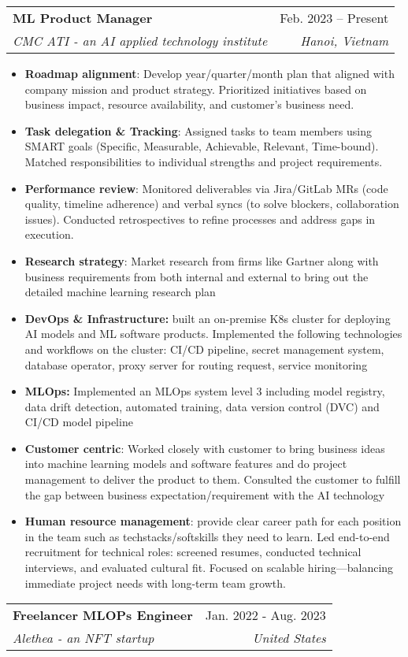 \documentclass[letterpaper,11pt]{article}
\makeatletter
\newcommand{\resumeItem}[1]{
  \item\small{
    {#1 \vspace{-2pt}}
  }
}
\newcommand{\resumeSubheading}[4]{
  \vspace{-2pt}\item
    \begin{tabular*}{0.97\textwidth}[t]{l@{\extracolsep{\fill}}r}
      \textbf{#1} & #2 \\
      \textit{\small#3} & \textit{\small #4} \\
    \end{tabular*}\vspace{-7pt}
}
\newcommand{\resumeItemListStart}{\begin{itemize}}
\newcommand{\resumeItemListEnd}{\end{itemize}\vspace{-5pt}}
\makeatother
\begin{document}
    \resumeSubheading
      {ML Product Manager}{Feb. 2023 -- Present}
      {CMC ATI - an AI applied technology institute}{Hanoi,  Vietnam}
      \resumeItemListStart
	\resumeItem{\textbf{Roadmap alignment}: Develop year/quarter/month plan that aligned with company mission and product strategy. Prioritized initiatives based on business impact, resource availability, and customer's business need.  }
	\resumeItem{\textbf{Task delegation \& Tracking}: Assigned tasks to team members using SMART goals (Specific, Measurable, Achievable, Relevant, Time-bound). Matched responsibilities to individual strengths and project requirements.  }
	\resumeItem{\textbf{Performance review}: Monitored deliverables via Jira/GitLab MRs (code quality, timeline adherence) and verbal syncs (to solve blockers, collaboration issues). Conducted retrospectives to refine processes and address gaps in execution. }
       \resumeItem{\textbf{Research strategy}: Market research from firms like Gartner along with business requirements from both internal and external to bring out the detailed machine learning research plan }
        \resumeItem{\textbf{DevOps \& Infrastructure:} built an on-premise K8s cluster for deploying AI models and ML software products. Implemented the following technologies and workflows on the cluster: CI/CD pipeline, secret management system, database operator, proxy server for routing request, service monitoring}
        \resumeItem{\textbf{MLOps:} Implemented an MLOps system level 3 including model registry, data drift detection, automated training, data version control (DVC) and CI/CD model pipeline}
	\resumeItem{\textbf{Customer centric}: Worked closely with customer to bring business ideas into machine learning models and software features and do project management to deliver the product to them. Consulted the customer to fulfill the gap between business expectation/requirement with the AI technology}
	\resumeItem{\textbf{Human resource management}: provide clear career path for each position in the team such as techstacks/softskills they need to learn. Led end-to-end recruitment for technical roles: screened resumes, conducted technical interviews, and evaluated cultural fit. Focused on scalable hiring—balancing immediate project needs with long-term team growth.}
    \resumeItemListEnd

\resumeSubheading
   {Freelancer MLOPs Engineer}  {Jan. 2022 - Aug. 2023} %
    {Alethea - an NFT startup} %
    {United States} %
   
\end{document}
